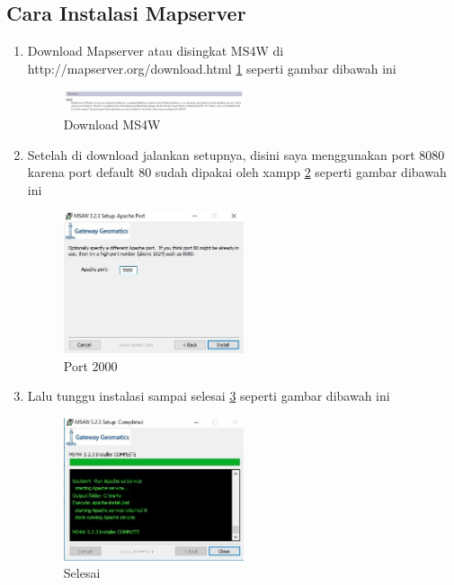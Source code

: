 \subsection{Cara Instalasi Mapserver}
\begin{enumerate}
\item
Download Mapserver atau disingkat MS4W di http://mapserver.org/download.html \ref{gambar1} seperti gambar dibawah ini
\begin{figure}[ht]
	    \centerline{\includegraphics[width=0.50\textwidth]{figures/gambar1.JPG}}
	    \caption{Download MS4W}
		\label{gambar1}
		\end{figure}
\item
Setelah di download jalankan setupnya, disini saya menggunakan port 8080 karena port default 80 sudah dipakai oleh xampp \ref{gambar2} seperti gambar dibawah ini
\begin{figure}[ht]
	    \centerline{\includegraphics[width=0.50\textwidth]{figures/gambar2.JPG}}
	    \caption{Port 2000}
		\label{gambar2}
		\end{figure}
\item
Lalu tunggu instalasi sampai selesai \ref{gambar3} seperti gambar dibawah ini
\begin{figure}[ht]
	    \centerline{\includegraphics[width=0.50\textwidth]{figures/gambar3.JPG}}
	    \caption{Selesai}
		\label{gambar3}

\end{figure}
\end{enumerate}
